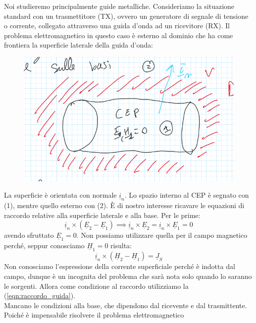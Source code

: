 \documentclass{book}
\begin{document}
        Noi studieremo principalmente guide metalliche. Consideriamo la situazione standard con un trasmettitore (TX),
        ovvero un generatore di segnale di tensione o corrente, collegato attraverso una guida d'onda ad un ricevitore (RX).
        Il problema elettromagnetico in questo caso è esterno al dominio che ha come frontiera la superficie laterale della
        guida d'onda:
        \begin{figure}[h!]
            \center 
            \includegraphics[width=0.75\linewidth]{Chapter_two/Chapt2img1.png}
        \end{figure}
        La superficie è orientata con normale $\underline{i}_{n}$. Lo spazio interno al CEP è segnato con (1), mentre quello esterno con
        (2). È di nostro interesse ricavare le equazioni di raccordo relative alla superficie laterale e alla base. Per le prime:
        \begin{equation}
            \label{eqn:raccordo_guida}
            \underline{i}_{n}\times (\underline{E}_{2}-\underline{E}_{1})\implies \underline{i}_{n}\times \underline{E}_{2}=\underline{i}_{n} \times \underline{E}_{1} = 0
        \end{equation}
        avendo sfruttato $\underline{E}_{1}=0$. Non possiamo utilizzare quella per il campo magnetico perché, seppur conosciamo $\underline{H}_{1}=0$ risulta:
        \begin{equation}
            \underline{i}_{n} \times (\underline{H}_{2}-\underline{H}_{1}) = \underline{J}_{S}
        \end{equation}
        Non conosciamo l'espressione della corrente superficiale perché è indotta dal campo, dunque è un incognita del problema che 
        sarà nota solo quando lo saranno le sorgenti. Allora come condizione al raccordo utilizziamo la (\ref{eqn:raccordo_guida}). \\
        Mancano le condizioni alla base, che dipendono dal ricevente e dal trasmittente. Poiché è impensabile risolvere il problema elettromagnetico 
\end{document}
